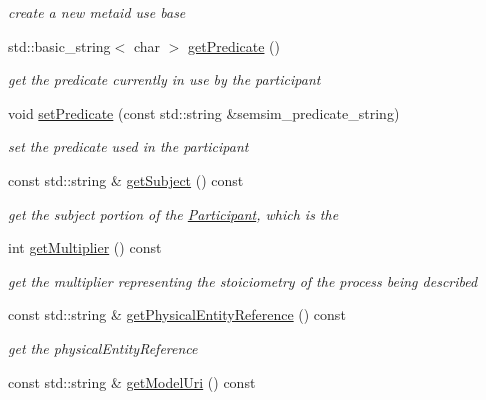 \begin{DoxyCompactItemize}
\begin{DoxyCompactList}\small\item\em create a new metaid use base \end{DoxyCompactList}\item 
std\+::basic\+\_\+string$<$ char $>$ \hyperlink{classomexmeta_1_1Participant_aa09f8c5736dd172b03d7898519d9478d}{get\+Predicate} ()
\begin{DoxyCompactList}\small\item\em get the predicate currently in use by the participant \end{DoxyCompactList}\item 
void \hyperlink{classomexmeta_1_1Participant_a1188d6a2036514eb6b649ce1e08eca4d}{set\+Predicate} (const std\+::string \&semsim\+\_\+predicate\+\_\+string)
\begin{DoxyCompactList}\small\item\em set the predicate used in the participant \end{DoxyCompactList}\item 
const std\+::string \& \hyperlink{classomexmeta_1_1Participant_a232d2e7fe124ee13650d666fdfc3b866}{get\+Subject} () const
\begin{DoxyCompactList}\small\item\em get the subject portion of the \hyperlink{classomexmeta_1_1Participant}{Participant}, which is the \end{DoxyCompactList}\item 
int \hyperlink{classomexmeta_1_1Participant_ac7121064734a05141a57f39dce10e71a}{get\+Multiplier} () const
\begin{DoxyCompactList}\small\item\em get the multiplier representing the stoiciometry of the process being described \end{DoxyCompactList}\item 
const std\+::string \& \hyperlink{classomexmeta_1_1Participant_a40a5858db6aaae7ec7095b320de838d1}{get\+Physical\+Entity\+Reference} () const
\begin{DoxyCompactList}\small\item\em get the physical\+Entity\+Reference \end{DoxyCompactList}\item 
\mbox{\label{classomexmeta_1_1Participant_ae78613f8d39ccfc23fc3624deb960fb0}} 
const std\+::string \& \hyperlink{classomexmeta_1_1Participant_ae78613f8d39ccfc23fc3624deb960fb0}{get\+Model\+Uri} () const

\end{DoxyCompactItemize}
